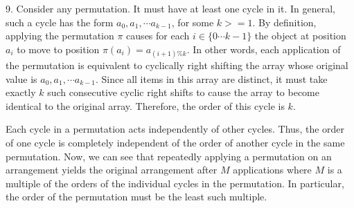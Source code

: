 \documentclass{article}
\begin{document}
9. Consider any permutation. It must have at least one cycle in it. In general, such a cycle has the form $a_0, a_1, \cdots a_{k - 1}$, for some $k >= 1$. By definition, applying the permutation $\pi$ causes for each $i \in \{0 \cdots k - 1\}$ the object at position $a_i$ to move to position $\pi(a_i) = a_{(i + 1) \% k}$. In other words, each application of the permutation is equivalent to cyclically right shifting the array whose original value is $a_0, a_1, \cdots a_{k - 1}$. Since all items in this array are distinct, it must take exactly $k$ such consecutive cyclic right shifts to cause the array to become identical to the original array. Therefore, the order of this cycle is $k$.

Each cycle in a permutation acts independently of other cycles. Thus, the order of one cycle is completely independent of the order of another cycle in the same permutation. Now, we can see that repeatedly applying a permutation on an arrangement yields the original arrangement after $M$ applications where $M$ is a multiple of the orders of the individual cycles in the permutation. In particular, the order of the permutation must be the least such multiple. 
\end{document}
